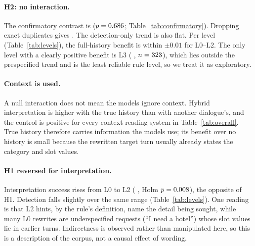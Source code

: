 \documentclass{article}
\begin{document}
\paragraph{H2: no interaction.}
The confirmatory contrast is \PrimaryEst{} \PrimaryCI{} ($p=0.686$; Table~\ref{tab:confirmatory}).
Dropping exact duplicates gives \SensEst{} \SensCI. The detection-only trend is also flat. Per
level (Table~\ref{tab:levels}), the full-history benefit is within $\pm0.01$ for L0--L2. The only
level with a clearly positive benefit is L3 (\LthreeGain{} \LthreeCI{}, $n=323$),
which lies outside the prespecified trend and is the least reliable rule level, so we treat it as
exploratory.

\begin{table}[t]
  \caption{Routed hybrid by rule level (matched line). $n$ counts gold requests with a mapped
  category, so NR here holds the few gold requests the rules call non-requests. Detection is
  three-way Stage~1 accuracy on all examples at that level.}
  \label{tab:levels}
  \centering
  \small
  
\end{table}

\paragraph{Context is used.}
A null interaction does not mean the models ignore context. Hybrid interpretation is
\ControlEst{} \ControlCI{} higher with the true history than with another dialogue's, and the control is positive
for every context-reading system in Table~\ref{tab:overall}. True history therefore carries
information the models use; its benefit over no history is small because the rewritten target
turn usually already states the category and slot values.

\paragraph{H1 reversed for interpretation.}
Interpretation success rises from L0 to L2 (\HoneEst{} \HoneCI{}, Holm $p=0.008$), the opposite
of H1. Detection falls slightly over the same range (Table~\ref{tab:levels}). One reading is that
L2 hints, by the rule's definition, name the detail being sought, while many L0 rewrites are
underspecified requests (``I need a hotel'') whose slot values lie in earlier turns. Indirectness
is observed rather than manipulated here, so this is a description of the corpus, not a causal
effect of wording.
\end{document}

